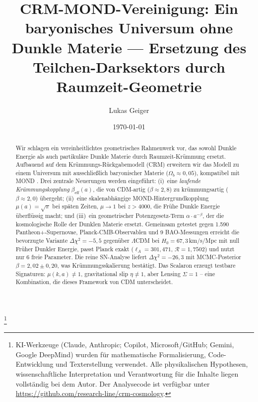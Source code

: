 \documentclass[aps,prd,twocolumn,superscriptaddress,nofootinbib]{revtex4-2}
\begin{document}

\title{CRM-MOND-Vereinigung: Ein baryonisches Universum ohne Dunkle Materie --- Ersetzung des Teilchen-Darksektors durch Raumzeit-Geometrie}

\author{Lukas Geiger}

\date{\today}


\begin{abstract}
Wir schlagen ein vereinheitlichtes geometrisches Rahmenwerk vor, das sowohl Dunkle Energie als auch partikul\"are Dunkle Materie durch Raumzeit-Kr\"ummung ersetzt. Aufbauend auf dem Kr\"ummungs-R\"uckgabemodell (CRM) \cite{Geiger2026} erweitern wir das Modell zu einem Universum mit ausschließlich baryonischer Materie ($\Omega_b \approx 0{,}05$), kompatibel mit MOND \cite{Milgrom1983}. Drei zentrale Neuerungen werden eingef\"uhrt: (i)~eine \textit{laufende Kr\"ummungskopplung} $\beta_{\mathrm{eff}}(a)$, die von CDM-artig ($\beta \approx 2{,}8$) zu kr\"ummungsartig ($\beta \approx 2{,}0$) \"ubergeht; (ii)~eine skalenabh\"angige MOND-Hintergrundkopplung $\mu(a) = \sqrt{\pi}$ bei sp\"aten Zeiten, $\mu \to 1$ bei $z > 4000$, die Fr\"uhe Dunkle Energie \"uberfl\"ussig macht; und (iii)~ein geometrischer Potenzgesetz-Term $\alpha \cdot a^{-\beta}$, der die kosmologische Rolle der Dunklen Materie ersetzt. Gemeinsam getestet gegen 1.590 Pantheon+-Supernovae, Planck-CMB-Observablen und 9 BAO-Messungen erreicht die bevorzugte Variante $\Delta\chi^2 = -5{,}5$ gegen\"uber $\Lambda$CDM bei $H_0 = 67{,}3$\,km/s/Mpc mit null Fr\"uher Dunkler Energie, passt Planck exakt ($\ell_A = 301{,}471$, $\mathcal{R} = 1{,}7502$) und nutzt nur 6 freie Parameter. Die reine SN-Analyse liefert $\Delta\chi^2 = -26{,}3$ mit MCMC-Posterior $\beta = 2{,}02 \pm 0{,}20$, was Kr\"ummungsskalierung best\"atigt. Das Scalaron erzeugt testbare Signaturen: $\mu(k,a) \neq 1$, gravitational slip $\eta \neq 1$, aber Lensing $\Sigma = 1$ -- eine Kombination, die dieses Framework von CDM unterscheidet.

\end{abstract}


\thanks{KI-Werkzeuge (Claude, Anthropic; Copilot, Microsoft/GitHub; Gemini, Google DeepMind) wurden für mathematische Formalisierung, Code-Entwicklung und Texterstellung verwendet. Alle physikalischen Hypothesen, wissenschaftliche Interpretation und Verantwortung für die Inhalte liegen vollständig bei dem Autor. Der Analysecode ist verfügbar unter \url{https://github.com/research-line/crm-cosmology}.}
\end{document}
